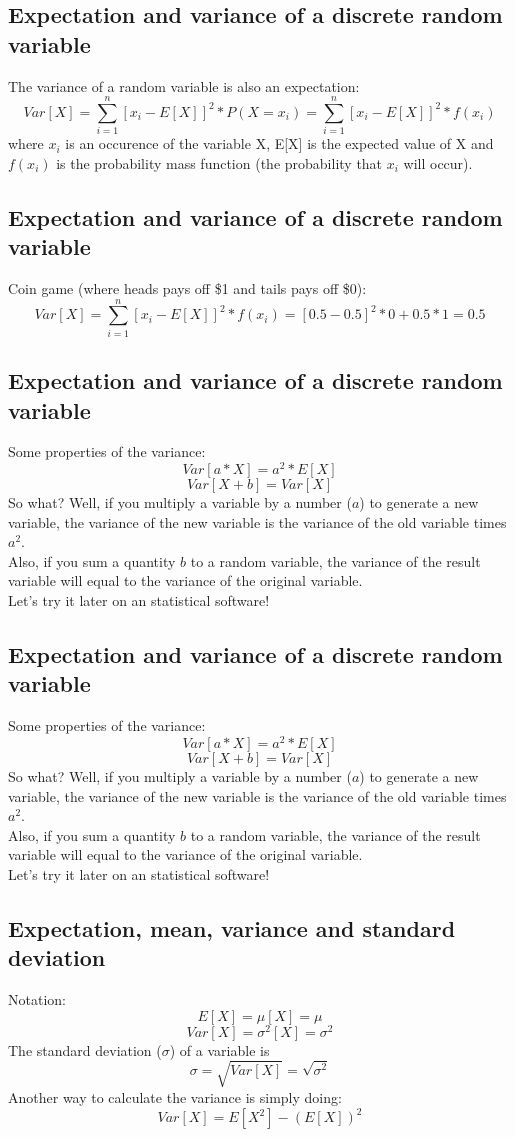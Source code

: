 \documentclass[11pt]{article}
\begin{document}
	\subsection*{Expectation and variance of a discrete random variable}
	The variance of a random variable is also an expectation:
		\[Var[X] = \sum\limits_{i=1}^n[x_i - E[X]]^2 * P(X=x_i) =\sum\limits_{i=1}^n[x_i - E[X]]^2 * f(x_i)\]
where $x_i$ is an occurence of the variable X, E[X] is the expected value of X and $f(x_i)$ is the probability mass function (the probability that $x_i$ will occur).

	\subsection*{Expectation and variance of a discrete random variable}
	Coin game (where heads pays off \$1 and tails pays off \$0):
	\[Var[X] = \sum\limits_{i=1}^n[x_i - E[X]]^2 * f(x_i) = [0.5 - 0.5]^2 * 0 + 0.5 * 1 = 0.5\]


	\subsection*{Expectation and variance of a discrete random variable}
	Some properties of the variance:
	\[Var[a*X] = a^2 * E[X]\]
	\[Var[X+ b] = Var[X]\]
	So what? Well, if you multiply a variable by a number ($a$) to generate a new variable, the variance of the new variable is the variance of the old variable times $a^2$.
	\newline\\Also, if you sum a quantity $b$ to a random variable, the variance of the result variable will equal to the variance of the original variable.
	\newline\\Let's try it later on an statistical software!

	\subsection*{Expectation and variance of a discrete random variable}
	Some properties of the variance:
	\[Var[a*X] = a^2 * E[X]\]
	\[Var[X+ b] = Var[X]\]
	So what? Well, if you multiply a variable by a number ($a$) to generate a new variable, the variance of the new variable is the variance of the old variable times $a^2$.
	\newline\\Also, if you sum a quantity $b$ to a random variable, the variance of the result variable will equal to the variance of the original variable.
	\newline\\Let's try it later on an statistical software!

	\subsection*{Expectation, mean, variance and standard deviation}
	Notation:
	\[E[X] = \mu[X] = \mu\]
	\[Var[X] = \sigma^2[X] = \sigma^2\]
	The standard deviation ($\sigma$) of a variable is
	\[\sigma = \sqrt{Var[X]} = \sqrt{\sigma^2}\]
	Another way to calculate the variance is simply doing: 
	\[Var[X] = E[X^2] - (E[X])^2\]	
\end{document}
